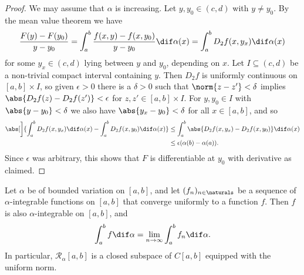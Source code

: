 \documentclass[article, a4paper, 11pt, oneside]{memoir}
\numberwithin{equation}{chapter}
\newcommand{\calR}{\mathcal{R}}
\begin{document}
\begin{proof}
    We may assume that $\alpha$ is increasing. Let $y,y_0 \in (c,d)$ with $y \neq y_0$. By the mean value theorem we have
    \begin{equation*}
        \frac{F(y) - F(y_0)}{y - y_0}
            = \int_a^b \frac{f(x,y) - f(x,y_0)}{y - y_0} \dif\alpha(x)
            = \int_a^b D_2 f(x, y_x) \dif\alpha(x)
    \end{equation*}
    for some $y_x \in (c,d)$ lying between $y$ and $y_0$, depending on $x$. Let $I \subseteq (c,d)$ be a non-trivial compact interval containing $y$. Then $D_2 f$ is uniformly continuous on $[a,b] \times I$, so given $\epsilon > 0$ there is a $\delta > 0$ such that $\norm{z-z'} < \delta$ implies $\abs{D_2 f(z) - D_2 f(z')} < \epsilon$ for $z,z' \in [a,b] \times I$. For $y,y_0 \in I$ with $\abs{y-y_0} < \delta$ we also have $\abs{y_x-y_0} < \delta$ for all $x \in [a,b]$, and so
    \begin{align*}
        \abs[\bigg]{ \int_a^b D_2 f(x, y_x) \dif\alpha(x)
            - \int_a^b D_2 f(x, y_0) \dif\alpha(x) }
            &\leq \int_a^b \abs{ D_2 f(x, y_x) - D_2 f(x, y_0) } \dif\alpha(x) \\
            &\leq \epsilon (\alpha(b) - \alpha(a)).
    \end{align*}
    Since $\epsilon$ was arbitrary, this shows that $F$ is differentiable at $y_0$ with derivative as claimed.
\end{proof}


\begin{proposition}
    Let $\alpha$ be of bounded variation on $[a,b]$, and let $(f_n)_{n\in\naturals}$ be a sequence of $\alpha$-integrable functions on $[a,b]$ that converge uniformly to a function $f$. Then $f$ is also $\alpha$-integrable on $[a,b]$, and
    \begin{equation*}
        \int_a^b f \dif\alpha
            = \lim_{n\to\infty} \int_a^b f_n \dif\alpha.
    \end{equation*}
    In particular, $\calR_\alpha[a,b]$ is a closed subspace of $C[a,b]$ equipped with the uniform norm.
\end{proposition}
\end{document}
